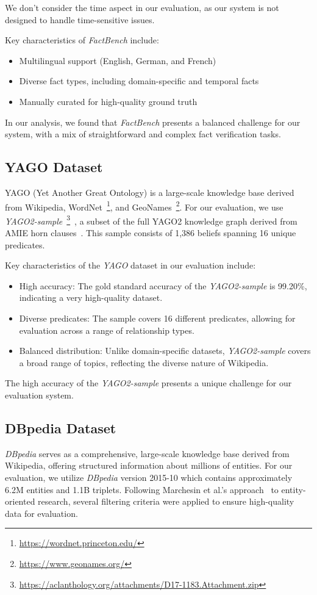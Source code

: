 We don't consider the time aspect in our evaluation, as our system is not designed to handle time-sensitive issues.

Key characteristics of \textit{FactBench} include:
\begin{itemize}
    \item Multilingual support (English, German, and French)
    \item Diverse fact types, including domain-specific and temporal facts
    \item Manually curated for high-quality ground truth
\end{itemize}

In our analysis, we found that \textit{FactBench} presents a balanced challenge for our system, with a mix of straightforward and complex fact verification tasks.
\subsection{YAGO Dataset}\label{subsec:empirical-evaluation:dataset-analysis:yago}
YAGO (Yet Another Great Ontology) is a large-scale knowledge base derived from Wikipedia, WordNet~\footnote{\url{https://wordnet.princeton.edu/}}, and GeoNames~\footnote{\url{https://www.geonames.org/}}.
For our evaluation, we use \textit{YAGO2-sample}~\footnote{\url{https://aclanthology.org/attachments/D17-1183.Attachment.zip}}~\cite{ojha-talukdar-2017-kgeval}, a subset of the full YAGO2 knowledge graph derived from AMIE horn clauses~\cite{Yago_AMIE}.
This sample consists of 1,386 beliefs spanning 16 unique predicates.

Key characteristics of the \textit{YAGO} dataset in our evaluation include:
\begin{itemize}
    \item High accuracy: The gold standard accuracy of the \textit{YAGO2-sample} is 99.20\%, indicating a very high-quality dataset.
    \item Diverse predicates: The sample covers 16 different predicates, allowing for evaluation across a range of relationship types.
    \item Balanced distribution: Unlike domain-specific datasets, \textit{YAGO2-sample} covers a broad range of topics, reflecting the diverse nature of Wikipedia.
\end{itemize}

The high accuracy of the \textit{YAGO2-sample} presents a unique challenge for our evaluation system.
\subsection{DBpedia Dataset}\label{subsec:empirical-evaluation:dataset-analysis:dbpedia}
\textit{DBpedia} serves as a comprehensive, large-scale knowledge base derived from Wikipedia, offering structured information about millions of entities.
For our evaluation, we utilize \textit{DBpedia} version 2015-10 which contains approximately 6.2M entities and 1.1B triplets.
Following Marchesin et al.'s approach~\cite{Marchesin_Silvello_Alonso_2024} to entity-oriented research, several filtering criteria were applied to ensure high-quality data for evaluation.

